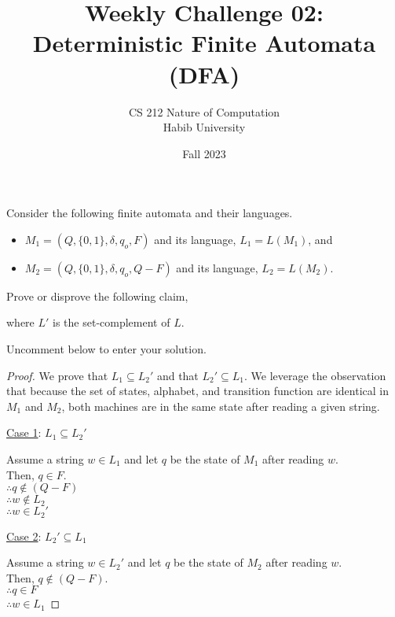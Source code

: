 \documentclass[a4paper]{exam}
\title{Weekly Challenge 02: Deterministic Finite Automata (DFA)}
\author{CS 212 Nature of Computation\\Habib University}
\date{Fall 2023}
\begin{document}
\maketitle

\begin{questions}
  

  Consider the following finite automata and their languages.
  \begin{itemize}
  \item $M_1=(Q, \{0,1\}, \delta, q_o, F)$ and its language, $L_1=L(M_1)$, and
  \item $M_2=(Q, \{0,1\}, \delta, q_o, Q-F)$ and its language, $L_2=L(M_2)$.
  \end{itemize}

  Prove or disprove the following claim,
  
  \centerline{
  }
  where $L'$ is the set-complement of $L$.

  Uncomment below to enter your solution.
  \begin{solution}

    \begin{proof}  We prove that $L_1 \subseteq L_2'$ and that $L_2' \subseteq L_1$. We leverage the observation that because the set of states, alphabet, and transition function are identical in $M_1$ and $M_2$, both machines are in the same state after reading a given string.
      
      \underline{Case 1}: $L_1 \subseteq L_2'$

      Assume a string $w\in L_1$ and let $q$ be the state of $M_1$ after reading $w$.\\
      Then, $q\in F$.\\
      $\therefore q\not\in (Q-F)$\\
      $\therefore w\not\in L_2$\\
      $\therefore w\in L_2'$\\\smallskip

      \underline{Case 2}: $L_2' \subseteq L_1$

      Assume a string $w\in L_2'$ and let $q$ be the state of $M_2$ after reading $w$.\\
      Then, $q\not\in (Q-F)$.\\
      $\therefore q\in F$\\
      $\therefore w\in L_1$      
    \end{proof}
  \end{solution}
  
\end{questions}
\end{document}
